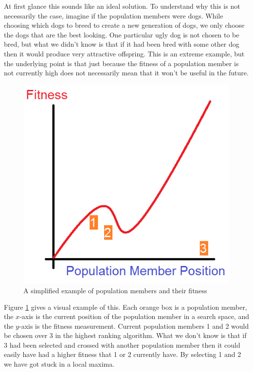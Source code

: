 \documentclass[]{report}
\begin{document}
At first glance this sounds like an ideal solution. To understand why this is not necessarily the case, imagine if the population members were dogs. While choosing which dogs to breed to create a new generation of dogs, we only choose the dogs that are the best looking. One particular ugly dog is not chosen to be bred, but what we didn't know is that if it had been bred with some other dog then it would produce very attractive offspring. This is an extreme example, but the underlying point is that just because the fitness of a population member is not currently high does not necessarily mean that it won't be useful in the future.\\

\begin{figure}
	\centering
	\includegraphics[scale=0.4]{figures/highestRanking.png}
	\caption{A simplified example of population members and their fitness}
	\label{highestRankingProblem}
\end{figure}

Figure \ref{highestRankingProblem} gives a visual example of this. Each orange box is a population member, the $x$-axis is the current position of the population member in a search space, and the $y$-axis is the fitness measurement. Current population members 1 and 2 would be chosen over 3 in the highest ranking algorithm. What we don't know is that if 3 had been selected and crossed with another population member then it could easily have had a higher fitness that 1 or 2 currently have. By selecting 1 and 2 we have got stuck in a local maxima.
\end{document}
